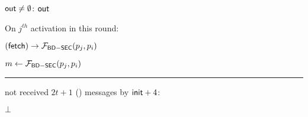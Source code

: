 \begin{bbox}[title={$\Pi_{\msf{Bracha}} (\mathcal{D}, \mathcal{P} = p_1,...,p_n)$ in $\F_{\msf{BD-SEC}}$-hybrid}]
	\dquad \If ${\mathsf {out}} \neq \emptyset$: \Output ${\mathsf {out}}$ 

	\dquad \Else On $j^{th}$ activation in this round:

		\dquad \quad \Send $({\mathsf {fetch}}) \rightarrow \mathcal{F}_{{\mathsf {BD-SEC}}}(p_j,p_i)$

		\dquad \quad $m \leftarrow \mathcal{F}_{{\mathsf {BD-SEC}}}(p_j,p_i)$

\vspace{2mm} \hrule \vspace{2mm}

\If not received $2t + 1$ (\textunderscore) messages by ${\mathsf {init}} + 4$:

	\dquad \Output $\bot$

\end{bbox}


